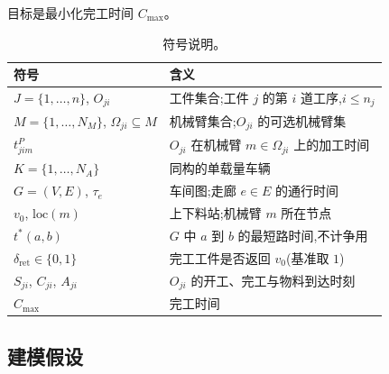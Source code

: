 \documentclass[manuscript,screen,review]{acmart}
\begin{document}
目标是最小化完工时间 $C_{\max}$。

\begin{table}[t]
\caption{符号说明。}
\label{tab:notation}
\small
\begin{tabular}{@{}ll@{}}
\toprule
符号 & 含义 \\
\midrule
$J=\{1,\dots,n\}$, $O_{ji}$ & 工件集合;工件 $j$ 的第 $i$ 道工序,$i\le n_j$ \\
$M=\{1,\dots,N_M\}$, $\Omega_{ji}\subseteq M$ & 机械臂集合;$O_{ji}$ 的可选机械臂集 \\
$t^P_{jim}$ & $O_{ji}$ 在机械臂 $m\in\Omega_{ji}$ 上的加工时间 \\
$K=\{1,\dots,N_A\}$ & 同构的单载量车辆 \\
$G=(V,E)$, $\tau_e$ & 车间图;走廊 $e\in E$ 的通行时间 \\
$v_0$, $\mathrm{loc}(m)$ & 上下料站;机械臂 $m$ 所在节点 \\
$t^{*}(a,b)$ & $G$ 中 $a$ 到 $b$ 的最短路时间,不计争用 \\
$\delta_{\mathrm{ret}}\in\{0,1\}$ & 完工工件是否返回 $v_0$(基准取 $1$) \\
$S_{ji}$, $C_{ji}$, $A_{ji}$ & $O_{ji}$ 的开工、完工与物料到达时刻 \\
$C_{\max}$ & 完工时间 \\
\bottomrule
\end{tabular}
\end{table}

\subsection{建模假设}
\label{sec:assumptions}
\end{document}
